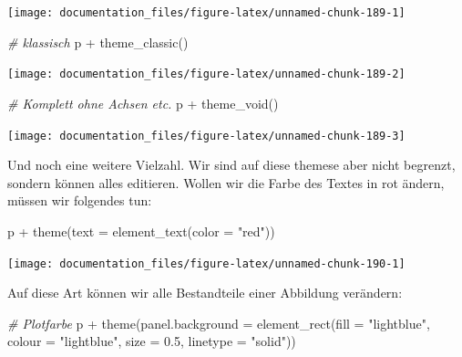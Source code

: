 \documentclass[
]{article}
\newenvironment{Shaded}{\begin{snugshade}}{\end{snugshade}}
\newcommand{\AttributeTok}[1]{\textcolor[rgb]{0.77,0.63,0.00}{#1}}
\newcommand{\CommentTok}[1]{\textcolor[rgb]{0.56,0.35,0.01}{\textit{#1}}}
\newcommand{\FloatTok}[1]{\textcolor[rgb]{0.00,0.00,0.81}{#1}}
\newcommand{\FunctionTok}[1]{\textcolor[rgb]{0.00,0.00,0.00}{#1}}
\newcommand{\NormalTok}[1]{#1}
\newcommand{\SpecialCharTok}[1]{\textcolor[rgb]{0.00,0.00,0.00}{#1}}
\newcommand{\StringTok}[1]{\textcolor[rgb]{0.31,0.60,0.02}{#1}}
\begin{document}
\begin{center}\texttt{[image: documentation\_files/figure-latex/unnamed-chunk-189-1]} \end{center}

\begin{Shaded}
\begin{Highlighting}[]
\CommentTok{\# klassisch}
\NormalTok{p }\SpecialCharTok{+} \FunctionTok{theme\_classic}\NormalTok{()}
\end{Highlighting}
\end{Shaded}

\begin{center}\texttt{[image: documentation\_files/figure-latex/unnamed-chunk-189-2]} \end{center}

\begin{Shaded}
\begin{Highlighting}[]
\CommentTok{\# Komplett ohne Achsen etc. }
\NormalTok{p }\SpecialCharTok{+} \FunctionTok{theme\_void}\NormalTok{()}
\end{Highlighting}
\end{Shaded}

\begin{center}\texttt{[image: documentation\_files/figure-latex/unnamed-chunk-189-3]} \end{center}

Und noch eine weitere Vielzahl. Wir sind auf diese themese aber nicht begrenzt, sondern können alles editieren. Wollen wir die Farbe des Textes in rot ändern, müssen wir folgendes tun:

\begin{Shaded}
\begin{Highlighting}[]
\NormalTok{p }\SpecialCharTok{+} \FunctionTok{theme}\NormalTok{(}\AttributeTok{text =} \FunctionTok{element\_text}\NormalTok{(}\AttributeTok{color =} \StringTok{"red"}\NormalTok{))}
\end{Highlighting}
\end{Shaded}

\begin{center}\texttt{[image: documentation\_files/figure-latex/unnamed-chunk-190-1]} \end{center}

Auf diese Art können wir alle Bestandteile einer Abbildung verändern:

\begin{Shaded}
\begin{Highlighting}[]
\CommentTok{\# Plotfarbe}
\NormalTok{p }\SpecialCharTok{+} \FunctionTok{theme}\NormalTok{(}\AttributeTok{panel.background =} \FunctionTok{element\_rect}\NormalTok{(}\AttributeTok{fill =} \StringTok{"lightblue"}\NormalTok{,}
                                \AttributeTok{colour =} \StringTok{"lightblue"}\NormalTok{,}
                                \AttributeTok{size =} \FloatTok{0.5}\NormalTok{, }\AttributeTok{linetype =} \StringTok{"solid"}\NormalTok{))}
\end{Highlighting}
\end{Shaded}
\end{document}
